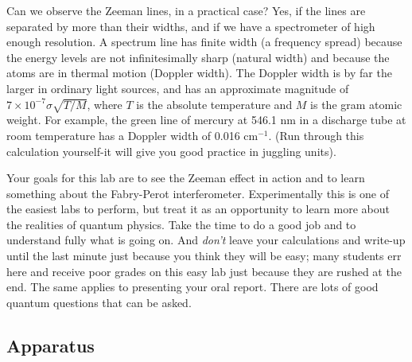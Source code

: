 \documentclass{../lab}
\begin{document}
Can we observe the Zeeman lines, in a practical case? Yes, if the lines are separated by more than their widths, and if we have a spectrometer of high enough resolution. A spectrum line has finite width (a frequency spread) because the energy levels are not infinitesimally sharp (natural width) and because the atoms are in thermal motion (Doppler width). The Doppler width is by far the larger in ordinary light sources, and has an approximate magnitude of $7 \times 10^{-7} \sigma \sqrt{T/M}$, where $T$ is the absolute temperature and $M$ is the gram atomic weight. For example, the green line of mercury at 546.1 nm in a discharge tube at room temperature has a Doppler width of 0.016 cm$^{-1}$. (Run through this calculation yourself-it will give you good practice in juggling units).

Your goals for this lab are to see the Zeeman effect in action and to learn something about the Fabry-Perot interferometer. Experimentally this is one of the easiest labs to perform, but treat it as an opportunity to learn more about the realities of quantum physics. Take the time to do a good job and to understand fully what is going on. And \emph{don't} leave your calculations and write-up until the last minute just because you think they will be easy; many students err here and receive poor grades on this easy lab just because they are rushed at the end. The same applies to presenting your oral report. There are lots of good quantum questions that can be asked.

\subsection{Apparatus}
\end{document}

